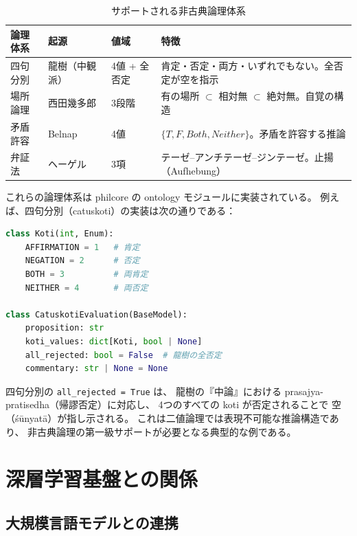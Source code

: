 \documentclass[a4paper,11pt]{ltjsarticle}
\begin{document}
\begin{table}[H]
\centering
\caption{サポートされる非古典論理体系}
\label{tab:logics}
\small
\begin{tabular}{lllp{4.5cm}}
\toprule
\textbf{論理体系} & \textbf{起源} & \textbf{値域} & \textbf{特徴} \\
\midrule
四句分別 & 龍樹（中観派） & 4値 + 全否定 & 肯定・否定・両方・いずれでもない。全否定が空を指示 \\
場所論理 & 西田幾多郎 & 3段階 & 有の場所 $\subset$ 相対無 $\subset$ 絶対無。自覚の構造 \\
矛盾許容 & Belnap & 4値 & $\{T, F, Both, Neither\}$。矛盾を許容する推論 \\
弁証法 & ヘーゲル & 3項 & テーゼ--アンチテーゼ--ジンテーゼ。止揚（Aufhebung） \\
\bottomrule
\end{tabular}
\end{table}

これらの論理体系は philcore の ontology モジュールに実装されている。
例えば、四句分別（catuskoti）の実装は次の通りである：

\begin{lstlisting}[language=Python,caption=四句分別（Catuskoti）の実装]
class Koti(int, Enum):
    AFFIRMATION = 1   # 肯定
    NEGATION = 2      # 否定
    BOTH = 3          # 両肯定
    NEITHER = 4       # 両否定

class CatuskotiEvaluation(BaseModel):
    proposition: str
    koti_values: dict[Koti, bool | None]
    all_rejected: bool = False  # 龍樹の全否定
    commentary: str | None = None
\end{lstlisting}

四句分別の \texttt{all\_rejected = True} は、
龍樹の『中論』\cite{garfield1995}における
prasajya-pratisedha（帰謬否定）に対応し、
4つのすべての koti が否定されることで
空（śūnyatā）が指し示される。
これは二値論理では表現不可能な推論構造であり、
非古典論理の第一級サポートが必要となる典型的な例である。


\section{深層学習基盤との関係}\label{sec:deep-learning}

\subsection{大規模言語モデルとの連携}
\end{document}
